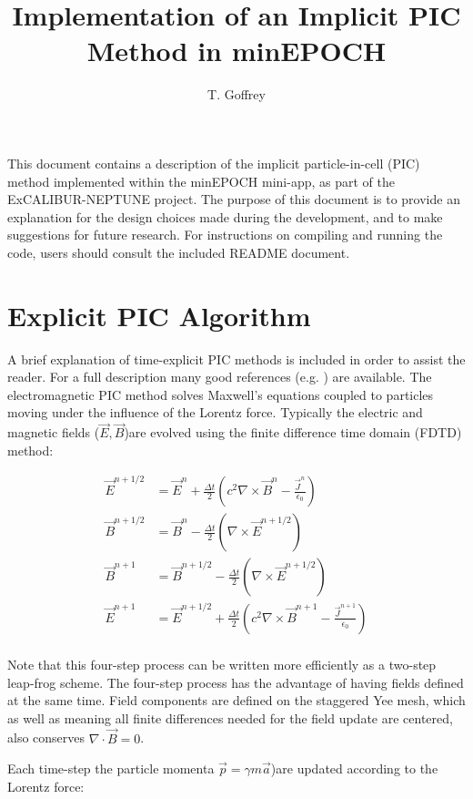 \documentclass{article}
\title{Implementation of an Implicit PIC Method in minEPOCH}
\author{T. Goffrey}
\begin{document}
\maketitle

This document contains a description of the implicit particle-in-cell (PIC) method implemented within the minEPOCH mini-app, as part of the ExCALIBUR-NEPTUNE project. The purpose of this document is to provide an explanation for the design choices made during the development, and to make suggestions for future research. For instructions on compiling and running the code, users should consult the included README document. 

\section{Explicit PIC Algorithm}
A brief explanation of time-explicit PIC methods is included in order to assist the reader. For a full description many good references (e.g. \cite{birdsall} \cite{EPOCH}) are available. The electromagnetic PIC method solves Maxwell's equations coupled to particles moving under the influence of the Lorentz force. Typically the electric and magnetic fields ($\vec{E}, \vec{B}$)are evolved using the finite difference time domain (FDTD) method:

\begin{align}
  \vec{E}^{n+1/2} &= \vec{E}^n + \frac{\Delta t}{2}\left(c^2 \nabla \times \vec{B}^n - \frac{\vec{J}^n}{\epsilon_0}\right) \\
  \vec{B}^{n+1/2} &= \vec{B}^n - \frac{\Delta t}{2}\left(\nabla \times \vec{E}^{n+1/2}\right) \\
  \vec{B}^{n+1} &= \vec{B}^{n+1/2} - \frac{\Delta t}{2}\left(\nabla \times \vec{E}^{n+1/2}\right) \\
  \vec{E}^{n+1} &= \vec{E}^{n+1/2} + \frac{\Delta t}{2}\left(c^2 \nabla \times \vec{B}^{n+1} - \frac{\vec{J}^{n+1}}{\epsilon_0}\right) \\
\end{align}

Note that this four-step process can be written more efficiently as a two-step leap-frog scheme. The four-step process has the advantage of having fields defined at the same time.
Field components are defined on the staggered Yee \cite{Yee} mesh, which as well as meaning all finite differences needed for the field update are centered, also conserves $\nabla \cdot \vec{B} = 0$.

Each time-step the particle momenta $\vec{p} = \gamma m \vec{a}$)are updated according to the Lorentz force:
\end{document}
